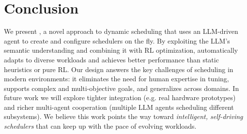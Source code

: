 \section{Conclusion}

We present \sys{}, a novel approach to dynamic scheduling that uses an LLM-driven agent to create and configure schedulers on the fly. By exploiting the LLM's semantic understanding and combining it with RL optimization, \sys{} automatically adapts to diverse workloads and achieves better performance than static heuristics or pure RL. Our design answers the key challenges of scheduling in modern environments: it eliminates the need for human expertise in tuning, supports complex and multi-objective goals, and generalizes across domains. In future work we will explore tighter integration (e.g. real hardware prototypes) and richer multi-agent cooperation (multiple LLM agents scheduling different subsystems). We believe this work points the way toward \emph{intelligent, self-driving schedulers} that can keep up with the pace of evolving workloads.